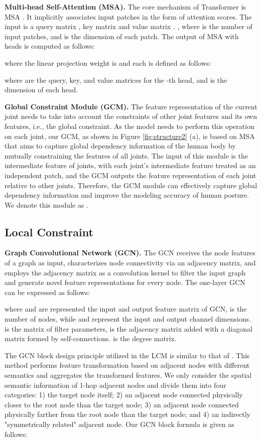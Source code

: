\documentclass[journal]{IEEEtran}
\begin{document}
{\bf{Multi-head Self-Attention (MSA).}} The core mechanism of Transformer is MSA \cite{vaswani2017attention}. It implicitly associates input patches in the form of attention scores. The input is a query matrix , key matrix  and value matrix . , where  is the number of input patches, and  is the dimension of each patch. The output of MSA with  heads is computed as follows:

where the linear projection weight is  and each  is defined as follows:

where  are the query, key, and value matrices for the -th head, and  is the dimension of each head.


{\bf{Global Constraint Module (GCM).}} The feature representation of the current joint needs to take into account the constraints of other joint features and its own features, i.e., the global constraint. As the model needs to perform this operation on each joint, our GCM, as shown in Figure \ref{fig:structure2} (a), is based on MSA that aims to capture global dependency information of the human body by mutually constraining the features of all joints. The input of this module is the intermediate feature of  joints, with each joint's intermediate feature treated as an independent patch, and the GCM outputs the feature representation of each joint relative to other joints. Therefore, the GCM module can effectively capture global dependency information and improve the modeling accuracy of human posture. We denote this module as .




\subsection{Local Constraint}
{\bf{Graph Convolutional Network (GCN).}} The GCN receives the node features of a graph as input, characterizes node connectivity via an adjacency matrix, and employs the adjacency matrix as a convolution kernel to filter the input graph and generate novel feature representations for every node. The one-layer GCN can be expressed as follows:

where  and  are represented the input and output feature matrix of GCN,  is the number of nodes, while  and  represent the input and output channel dimensions.  is the matrix of filter parameters,  is the adjacency matrix  added with a diagonal matrix  formed by self-connections.  is the degree matrix. 


The GCN block design principle utilized in the LCM is similar to that of \cite{cai2019exploiting}. This method performs feature transformation based on adjacent nodes with different semantics and aggregates the transformed features. We only consider the spatial semantic information of 1-hop adjacent nodes and divide them into four categories: 1) the target node itself; 2) an adjacent node connected physically closer to the root node than the target node; 3) an adjacent node connected physically farther from the root node than the target node; and 4) an indirectly "symmetrically related" adjacent node. Our GCN block formula is given as follows:
\end{document}
